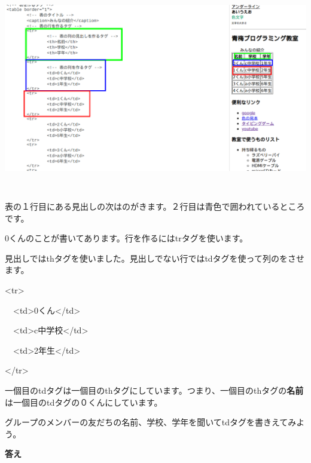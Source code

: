 \documentclass[a4paper,12pt]{jarticle}
\begin{document}
\centering
\includegraphics[width=16.388cm,height=9.036cm]{textbook-img191.png}

\flushleft

\bigskip

表の１行目にある見出しの次はのがきます。２行目は青色で囲われているところです。

0くんのことが書いてあります。行を作るにはtrタグを使います。

見出しではthタグを使いました。見出しでない行ではtdタグを使って列のをさせます。

{\textless}tr{\textgreater}

\ \ {\textless}td{\textgreater}0くん{\textless}/td{\textgreater}

\ \ {\textless}td{\textgreater}c中学校{\textless}/td{\textgreater}

\ \ {\textless}td{\textgreater}2年生{\textless}/td{\textgreater}

{\textless}/tr{\textgreater}

一個目のtdタグは一個目のthタグにしています。つまり、一個目のthタグの\textbf{名前}は一個目のtdタグの０くんにしています。


\bigskip


\bigskip

グループのメンバーの友だちの名前、学校、学年を聞いてtdタグを書きえてみよう。


\bigskip


\bigskip



\bigskip

\clearpage
\textbf{答え}
\end{document}

